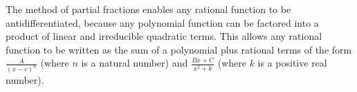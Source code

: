 
\begin{summary}
\item The method of partial fractions enables any rational function to be antidifferentiated, because any polynomial function can be factored into a product of linear and irreducible quadratic terms.  This allows any rational function to be written as the sum of a polynomial plus rational terms of the form $\frac{A}{(x-c)^n}$ (where $n$ is a natural number) and $\frac{Bx+C}{x^2 + k}$ (where $k$ is a positive real number).
\end{summary}

\clearpage

 

\cleardoublepage